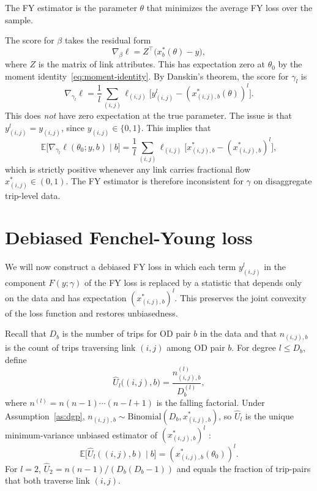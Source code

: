 \documentclass[12pt]{article}
\begin{document}
The FY estimator is the parameter $\theta$ that minimizes the average FY loss over the sample.

The score for $\beta$ takes the residual form
\[
    \nabla_\beta \ell = Z^\top \bigl( x^*_b(\theta) - y \bigr),
\]
where $Z$ is the matrix of link attributes. This has expectation zero at $\theta_0$ by the moment identity~\eqref{eq:moment-identity}. By Danskin's theorem, the score for $\gamma_l$ is
\[
    \nabla_{\gamma_l} \ell = \frac{1}{l} \sum_{(i,j)} \ell_{(i,j)} \bigl[ y_{(i,j)}^l - (x^*_{(i,j),b}(\theta))^l \bigr].
\]
This does \emph{not} have zero expectation at the true parameter. The issue is that $y_{(i,j)}^l = y_{(i,j)}$, since $y_{(i,j)} \in \{0,1\}$. This implies that
\[
    \mathbb{E}\bigl[\nabla_{\gamma_l} \ell(\theta_0; y, b)
        \mid b\bigr]
    = \frac{1}{l} \sum_{(i,j)} \ell_{(i,j)}
    \bigl[ x^*_{(i,j),b} - (x^*_{(i,j),b})^l \bigr],
\]
which is strictly positive whenever any link carries fractional flow $x_{(i,j)}^* \in (0, 1)$. The FY estimator is therefore inconsistent for $\gamma$ on disaggregate trip-level data.


\section{Debiased Fenchel-Young loss}\label{sec:debiased}

We will now construct a debiased FY loss in which each term $y^l_{(i,j)}$ in the component $F(y;\gamma)$ of the FY loss is replaced by a statistic that depends only on the data and has expectation $(x^*_{(i,j),b})^l$. This preserves the joint convexity of the loss function and restores unbiasedness.

Recall that $D_b$ is the number of trips for OD pair $b$ in the data and that $n_{(i,j),b}$ is the count of trips traversing link $(i,j)$ among OD pair $b$. For degree $l \leq D_b$,
define
\begin{equation}\label{eq:u-stat}
    \hat{U}_l\bigl((i,j), b\bigr)
    = \frac{n_{(i,j),b}^{(l)}}{D_b^{(l)}},
\end{equation}
where $n^{(l)} = n(n-1)\cdots(n-l+1)$ is the falling factorial.
Under Assumption~\ref{as:dgp}, $n_{(i,j),b} \sim
\text{Binomial}(D_b, x^*_{(i,j),b})$, so $\hat{U}_l$ is the unique
minimum-variance unbiased estimator of $(x^*_{(i,j),b})^l$ \citep{lehmann1998theory}:
\begin{equation}\label{eq:u-unbiased}
    \mathbb{E}\bigl[\hat{U}_l((i,j), b) \mid b\bigr]
    = (x^*_{(i,j),b}(\theta_0))^l.
\end{equation}
For $l = 2$, $\hat{U}_2 = n(n-1) / (D_b(D_b - 1))$ and equals
the fraction of trip-pairs that both traverse link $(i,j)$. 
\end{document}
